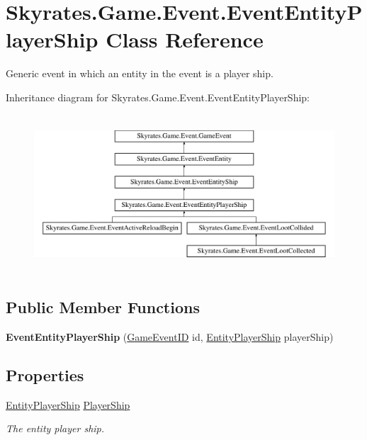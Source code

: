 \hypertarget{class_skyrates_1_1_game_1_1_event_1_1_event_entity_player_ship}{\section{Skyrates.\-Game.\-Event.\-Event\-Entity\-Player\-Ship Class Reference}
\label{class_skyrates_1_1_game_1_1_event_1_1_event_entity_player_ship}
}


Generic event in which an entity in the event is a player ship.  


Inheritance diagram for Skyrates.\-Game.\-Event.\-Event\-Entity\-Player\-Ship\-:\begin{figure}[H]
\begin{center}
\leavevmode
\includegraphics[height=5.915493cm]{class_skyrates_1_1_game_1_1_event_1_1_event_entity_player_ship}
\end{center}
\end{figure}
\subsection*{Public Member Functions}
\begin{DoxyCompactItemize}
\item 
\hypertarget{class_skyrates_1_1_game_1_1_event_1_1_event_entity_player_ship_a5273f5aff6685126f3bd1b0534b7ce11}{{\bfseries Event\-Entity\-Player\-Ship} (\hyperlink{namespace_skyrates_1_1_game_1_1_event_ad31565d2f03f234f8f77ebf23ff8f150}{Game\-Event\-I\-D} id, \hyperlink{class_skyrates_1_1_entity_1_1_entity_player_ship}{Entity\-Player\-Ship} player\-Ship)}\label{class_skyrates_1_1_game_1_1_event_1_1_event_entity_player_ship_a5273f5aff6685126f3bd1b0534b7ce11}

\end{DoxyCompactItemize}
\subsection*{Properties}
\begin{DoxyCompactItemize}
\item 
\hyperlink{class_skyrates_1_1_entity_1_1_entity_player_ship}{Entity\-Player\-Ship} \hyperlink{class_skyrates_1_1_game_1_1_event_1_1_event_entity_player_ship_a87aeaecccf2800c74ef4ce196f9ac999}{Player\-Ship}
\begin{DoxyCompactList}\small\item\em The entity player ship. \end{DoxyCompactList}\end{DoxyCompactItemize}

